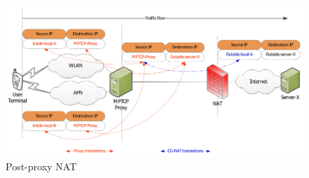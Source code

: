 \begin{figure}[h]
	\centering
	\includegraphics[scale=0.3]{figures/oro/oro_mptcp_nat2.png}
	\caption{Post-proxy NAT}
    	\label{fig:oro_mptcp_nat2}
\end{figure}


